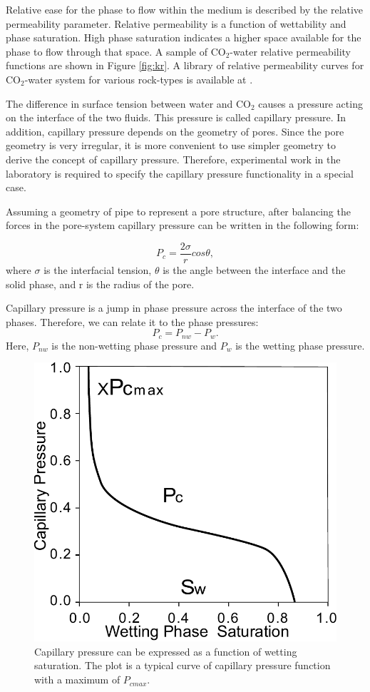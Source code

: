 Relative ease for the phase to flow within the medium is described by
the relative
permeability parameter. Relative permeability is a function of wettability and
phase saturation. High phase saturation indicates a higher space available for
the phase to flow through that space. A sample of $\mbox{CO}_2$-water relative
permeability functions are shown in Figure \ref{fig:kr}. A library of relative
permeability curves for $\mbox{CO}_2$-water system for various rock-types is
available at \cite{krLib}.

The difference in surface tension between water and $\mbox{CO}_2$ causes a
pressure acting on the interface of the two fluids. This pressure is called
capillary pressure. In addition, capillary pressure depends on the geometry of
pores. Since the pore geometry is very irregular, it is more convenient to use
simpler geometry to derive the concept of capillary pressure. Therefore,
experimental work in the laboratory is required to specify the capillary
pressure functionality in a special case. 

Assuming a geometry of pipe to represent a pore structure, after balancing the
forces in the pore-system capillary pressure can be written in the following
form:

\begin{equation}
 P_c=\frac{2\sigma}{r}cos\theta,
 \label{eq:pcS}
\end{equation} where $\sigma$ is the interfacial tension, $\theta$ is the angle
between the interface and the solid phase, and r is the radius of the pore.

Capillary pressure is a jump in phase pressure across the interface of the two
phases. Therefore, we can relate it to the phase pressures:
\begin{equation}
 P_c=P_{nw}-P_w.
 \label{eq:pcJump}
\end{equation} Here, $P_{nw}$ is the non-wetting phase pressure and $P_w$ is the
wetting phase pressure. 


\begin{figure} 
  \centering{}
  \includegraphics[width= 0.45 \linewidth]{./figurer/Pc}
  \caption{Capillary pressure can be expressed as a function of wetting
saturation. The plot is a typical curve of capillary pressure function with a
maximum of $P_{cmax}$.}
  \label{fig:pc}
\end{figure}

